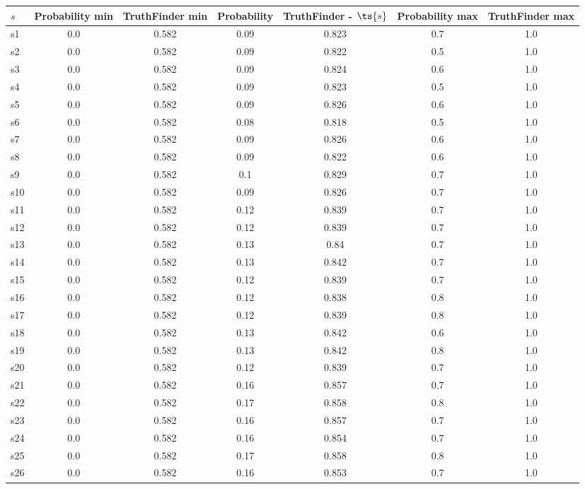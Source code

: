 \documentclass{article}
\begin{document}
\noindent\begin{tabular}{|l|c|c|c|c|c|c|}
\hline
$s$& Probability min & TruthFinder min & Probability & TruthFinder - $\ts{s}$ & Probability max & TruthFinder max\\
\hline
s1 &0.0 & 0.582 & 0.09 & 0.823 & 0.7 & 1.0\\
\hline
s2 &0.0 & 0.582 & 0.09 & 0.822 & 0.5 & 1.0\\
\hline
s3 &0.0 & 0.582 & 0.09 & 0.824 & 0.6 & 1.0\\
\hline
s4 &0.0 & 0.582 & 0.09 & 0.823 & 0.5 & 1.0\\
\hline
s5 &0.0 & 0.582 & 0.09 & 0.826 & 0.6 & 1.0\\
\hline
s6 &0.0 & 0.582 & 0.08 & 0.818 & 0.5 & 1.0\\
\hline
s7 &0.0 & 0.582 & 0.09 & 0.826 & 0.6 & 1.0\\
\hline
s8 &0.0 & 0.582 & 0.09 & 0.822 & 0.6 & 1.0\\
\hline
s9 &0.0 & 0.582 & 0.1 & 0.829 & 0.7 & 1.0\\
\hline
s10 &0.0 & 0.582 & 0.09 & 0.826 & 0.7 & 1.0\\
\hline
s11 &0.0 & 0.582 & 0.12 & 0.839 & 0.7 & 1.0\\
\hline
s12 &0.0 & 0.582 & 0.12 & 0.839 & 0.7 & 1.0\\
\hline
s13 &0.0 & 0.582 & 0.13 & 0.84 & 0.7 & 1.0\\
\hline
s14 &0.0 & 0.582 & 0.13 & 0.842 & 0.7 & 1.0\\
\hline
s15 &0.0 & 0.582 & 0.12 & 0.839 & 0.7 & 1.0\\
\hline
s16 &0.0 & 0.582 & 0.12 & 0.838 & 0.8 & 1.0\\
\hline
s17 &0.0 & 0.582 & 0.12 & 0.839 & 0.8 & 1.0\\
\hline
s18 &0.0 & 0.582 & 0.13 & 0.842 & 0.6 & 1.0\\
\hline
s19 &0.0 & 0.582 & 0.13 & 0.842 & 0.8 & 1.0\\
\hline
s20 &0.0 & 0.582 & 0.12 & 0.839 & 0.7 & 1.0\\
\hline
s21 &0.0 & 0.582 & 0.16 & 0.857 & 0.7 & 1.0\\
\hline
s22 &0.0 & 0.582 & 0.17 & 0.858 & 0.8 & 1.0\\
\hline
s23 &0.0 & 0.582 & 0.16 & 0.857 & 0.7 & 1.0\\
\hline
s24 &0.0 & 0.582 & 0.16 & 0.854 & 0.7 & 1.0\\
\hline
s25 &0.0 & 0.582 & 0.17 & 0.858 & 0.8 & 1.0\\
\hline
s26 &0.0 & 0.582 & 0.16 & 0.853 & 0.7 & 1.0\\

\end{tabular}
\end{document}
